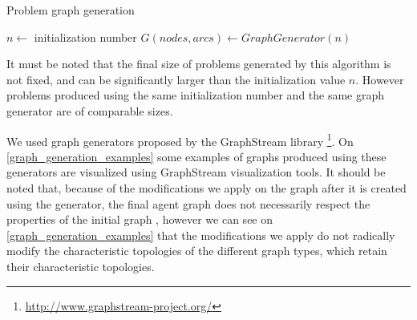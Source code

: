 \begin{algorithm}
\caption{Problem graph generation}
\label{algo_graph_generation}
	$n \leftarrow$ initialization number\;
	$G(nodes, arcs) \leftarrow GraphGenerator(n)$\;
			

\end{algorithm}

It must be noted that the final size of problems generated by this algorithm is not fixed, and can be significantly larger than the initialization value $n$. However problems produced using the same initialization number and the same graph generator are of comparable sizes.

We used graph generators proposed by the GraphStream library \footnote{\url{http://www.graphstream-project.org/}}. On \figurename{} \ref{graph_generation_examples} some examples of graphs produced using these generators are visualized using GraphStream visualization tools. It should be noted that, because of the modifications we apply on the graph after it is created using the generator, the final agent graph does not necessarily respect the properties of the initial graph , however we can see on \figurename{} \ref{graph_generation_examples} that the modifications we apply do not radically modify the characteristic topologies of the different graph types, which retain their characteristic topologies.
 
